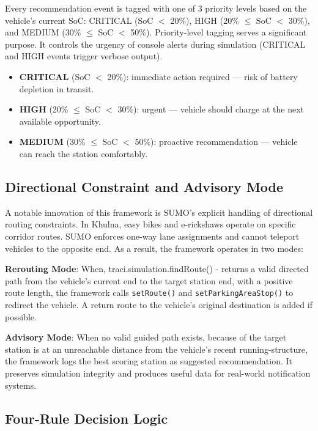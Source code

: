 \documentclass[conference]{IEEEtran}
\begin{document}
Every recommendation event is tagged with one of 3 priority levels
based on the vehicle's current SoC: CRITICAL (SoC $<$ 20\%), HIGH
(20\% $\leq$ SoC $<$ 30\%), and MEDIUM (30\% $\leq$ SoC $<$ 50\%).
Priority-level tagging serves a significant purpose. It controls the
urgency of console alerts during simulation (CRITICAL and HIGH events
trigger verbose output).
\begin{itemize}
  \item \textbf{CRITICAL} (SoC $<$ 20\%): immediate action required
        --- risk of battery depletion in transit.
  \item \textbf{HIGH} (20\% $\leq$ SoC $<$ 30\%): urgent --- vehicle
        should charge at the next available opportunity.
  \item \textbf{MEDIUM} (30\% $\leq$ SoC $<$ 50\%): proactive
        recommendation --- vehicle can reach the station comfortably.
\end{itemize}

\subsection{Directional Constraint and Advisory Mode}

A notable innovation of this framework is SUMO's explicit handling of
directional routing constraints. In Khulna, easy bikes and e-rickshaws
operate on specific corridor routes. SUMO enforces one-way lane
assignments and cannot teleport vehicles to the opposite end. As a
result, the framework operates in two modes:

\textbf{Rerouting Mode}: When, {traci.simulation.findRoute()} -
returns a valid directed path from the vehicle's current end to the
target station end, with a positive route length, the framework calls
\texttt{setRoute()} and \texttt{setParkingAreaStop()} to redirect the
vehicle. A return route to the vehicle's original destination is added
if possible.

\textbf{Advisory Mode}: When no valid guided path exists, because of
the target station is at an unreachable distance from the vehicle's
recent running-structure, the framework logs the best scoring station
as suggested recommendation. It preserves simulation integrity and
produces useful data for real-world notification systems.

\subsection{Four-Rule Decision Logic}
\end{document}
